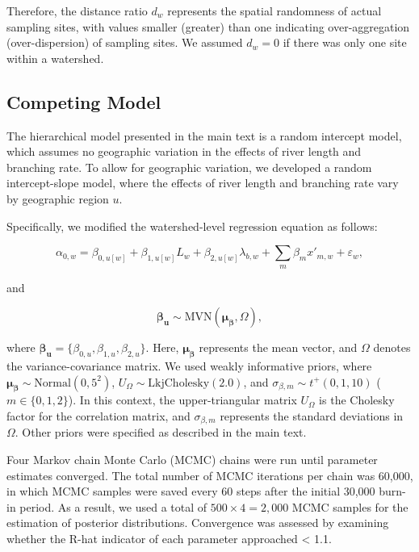 \documentclass[11pt, class=article, crop=false]{standalone}
\theoremstyle{definition}
\begin{document}
Therefore, the distance ratio $d_{w}$ represents the spatial randomness of actual sampling sites, with values smaller (greater) than one indicating over-aggregation (over-dispersion) of sampling sites.
We assumed $d_{w} = 0$ if there was only one site within a watershed.

\subsection{Competing Model}

The hierarchical model presented in the main text is a random intercept model, which assumes no geographic variation in the effects of river length and branching rate. To allow for geographic variation, we developed a random intercept-slope model, where the effects of river length and branching rate vary by geographic region $u$.

Specifically, we modified the watershed-level regression equation as follows:

\begin{equation}
    \alpha_{0, w} = \beta_{0, u[w]} + \beta_{1, u[w]} L_w + \beta_{2, u[w]} \lambda_{b, w} + \sum_m \beta_m x'_{m, w} + \varepsilon_{w},
    \label{eq:watershed-average}
\end{equation}

and

\begin{equation}
    \boldsymbol{\beta_u} \sim \mbox{MVN}(\boldsymbol{\mu_{\beta}}, \Omega),
\end{equation}

where $\boldsymbol{\beta_u} = \{\beta_{0, u}, \beta_{1, u}, \beta_{2, u}\}$. Here, $\boldsymbol{\mu_{\beta}}$ represents the mean vector, and $\Omega$ denotes the variance-covariance matrix.
We used weakly informative priors, where $\boldsymbol{\mu_{\beta}} \sim \mbox{Normal}(0, 5^2)$, $U_{\Omega} \sim \mbox{LkjCholesky}(2.0)$, and $\sigma_{\beta, m} \sim t^+(0, 1, 10)$ ($m \in \{0, 1, 2\}$). In this context, the upper-triangular matrix $U_{\Omega}$ is the Cholesky factor for the correlation matrix, and $\sigma_{\beta, m}$ represents the standard deviations in $\Omega$.
Other priors were specified as described in the main text.

Four Markov chain Monte Carlo (MCMC) chains were run until parameter estimates
converged.
The total number of MCMC iterations per chain was 60,000, in which MCMC samples were saved every 60 steps after the initial 30,000 burn-in period.
As a result, we used a total of $500 \times 4 = 2,000$ MCMC samples for the estimation of posterior distributions.
Convergence was assessed by examining whether the R-hat indicator of each parameter approached < 1.1.


\end{document}
